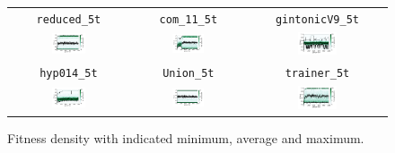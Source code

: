\documentclass[11pt,a4paper]{scrartcl}
\begin{document}
\begin{figure}[H]
\center
\begin{tabular}{ccc}
\texttt{reduced\_5t} & \texttt{com\_11\_5t} & \texttt{gintonicV9\_5t} \\
\includegraphics[width=0.3\textwidth]{img/self_adapt_2_reduced_5t.png} &
\includegraphics[width=0.3\textwidth]{img/self_adapt_2_com_11_5t.png} &
\includegraphics[width=0.3\textwidth]{img/self_adapt_2_gintonicV9_5t.png} \\
\texttt{hyp014\_5t} & \texttt{Union\_5t} & \texttt{trainer\_5t} \\
\includegraphics[width=0.3\textwidth]{img/self_adapt_2_hyp014_5t.png} &
\includegraphics[width=0.3\textwidth]{img/self_adapt_2_Union_5t.png} &
\includegraphics[width=0.3\textwidth]{img/self_adapt_2_trainer_5t.png}
\end{tabular}
\caption{Fitness density with indicated minimum, average and maximum.}
\label{fig:self_adapt_2_5t}
\end{figure}


{}

\end{document}
